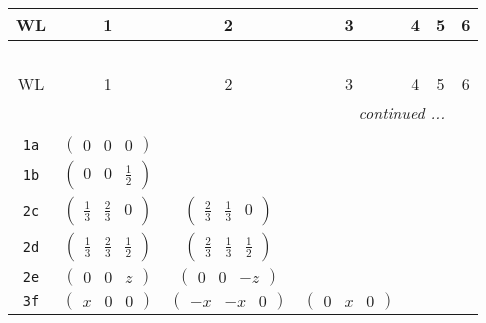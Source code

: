 \documentclass[fleqn,9pt,landscape]{jsarticle}
\begin{document}
\begin{center}
\renewcommand{\arraystretch}{1.2}
\begin{longtable}{ccccccc}
 \hline \hline
WL & 1 & 2 & 3 & 4 & 5 & 6 \\ \hline \endfirsthead

\multicolumn{6}{l}{\tablename\ \thetable{}} \\
 \hline \hline
WL & 1 & 2 & 3 & 4 & 5 & 6 \\ \hline \endhead

 \hline \hline
\multicolumn{6}{r}{\footnotesize\it continued ...} \\ \endfoot

 \hline \hline
\multicolumn{6}{r}{} \\ \endlastfoot

{\tt 1a} & $ \begin{pmatrix} 0 & 0 & 0 \end{pmatrix} $ & $  $ & $  $ & $  $ & $  $ & $  $ \\ \hline
{\tt 1b} & $ \begin{pmatrix} 0 & 0 & \frac{1}{2} \end{pmatrix} $ & $  $ & $  $ & $  $ & $  $ & $  $ \\ \hline
{\tt 2c} & $ \begin{pmatrix} \frac{1}{3} & \frac{2}{3} & 0 \end{pmatrix} $ & $ \begin{pmatrix} \frac{2}{3} & \frac{1}{3} & 0 \end{pmatrix} $ & $  $ & $  $ & $  $ & $  $ \\ \hline
{\tt 2d} & $ \begin{pmatrix} \frac{1}{3} & \frac{2}{3} & \frac{1}{2} \end{pmatrix} $ & $ \begin{pmatrix} \frac{2}{3} & \frac{1}{3} & \frac{1}{2} \end{pmatrix} $ & $  $ & $  $ & $  $ & $  $ \\ \hline
{\tt 2e} & $ \begin{pmatrix} 0 & 0 & z \end{pmatrix} $ & $ \begin{pmatrix} 0 & 0 & - z \end{pmatrix} $ & $  $ & $  $ & $  $ & $  $ \\ \hline
{\tt 3f} & $ \begin{pmatrix} x & 0 & 0 \end{pmatrix} $ & $ \begin{pmatrix} - x & - x & 0 \end{pmatrix} $ & $ \begin{pmatrix} 0 & x & 0 \end{pmatrix} $ & $  $ & $  $ & $  $ \\ \hline

\end{longtable}
\end{center}
\end{document}
